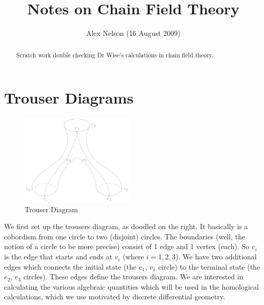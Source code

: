 \documentclass{amsart}
\title{Notes on Chain Field Theory}
\author{Alex Nelson (16 August 2009)}
\numberwithin{equation}{section}
\begin{document}
\maketitle
\begin{abstract}
Scratch work double checking Dr Wise's calculations in chain
field theory.
\end{abstract}

\section{Trouser Diagrams}

\begin{figure}
  \begin{center}
    \includegraphics[width=0.48\textwidth]{img/img0.eps}
  \end{center}
  \caption{\footnotesize {Trouser Diagram}}
\end{figure}
We first set up the trousers diagram, as doodled on the right. It
basically is a cobordism from one circle to two (disjoint)
circles. The boundaries (well, the notion of a circle to be more
precise) consist of 1 edge and 1 vertex (each). So $e_{i}$ is the
edge that starts and ends at $v_{i}$ (where $i=1,2,3$). We have
two additional edges which connects the initial state (the
$e_{1}$, $v_{1}$ circle) to the terminal state (the $e_{2}$,
$e_{3}$ circles). These edges define the trousers diagram. We are
interested in calculating the various algebraic quantities which
will be used in the homological calculations, which we use
motivated by discrete differential geometry.
\end{document}
